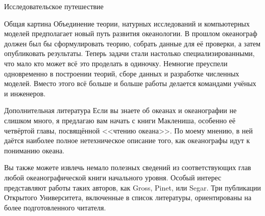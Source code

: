 \begin{chapter}{Исследовательское путешествие}
\begin{section}{Общая картина}
Объединение теории, натурных исследований и компьютерных моделей предполагает 
новый путь развития океанологии. В прошлом океанограф должен был бы сформулировать 
теорию, собрать данные для её проверки, а затем опубликовать результаты. 
Теперь задачи стали настолько специализированными, что мало кто может всё 
это проделать в одиночку. Немногие преуспели одновременно в построении теорий, 
сборе данных и разработке численных моделей. Вместо этого всё больше и больше 
работы делается командами учёных и инженеров.
%
\end{section}

\begin{section}{Дополнительная литература}
Если вы знаете об океанах и океанографии не слишком много, я предлагаю 
вам начать с книги Маклениша, особенно её четвёртой главы, посвящённой 
<<чтению океана>>. 
По моему мнению, в ней даётся наиболее полное нетехническое описание того, 
как океанографы идут к пониманию океана.
%

Вы также можете извлечь немало полезных сведений из соответствующих глав любой 
океанографической книги начального уровня. Особый интерес представляют работы 
таких авторов, как Gross, Pinet, или Segar. Три публикации Открытого 
Университета, включенные в список литературы, ориентированы на более 
подготовленного читателя. 
%


\end{section}
\end{chapter}
